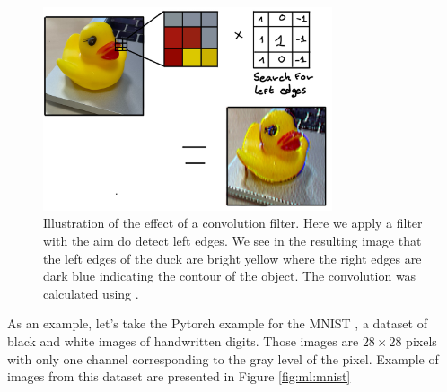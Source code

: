 \documentclass[../main.tex]{subfiles}
\begin{document}
\begin{figure}[ht]
  \centering
  \includegraphics[height=6cm]{images/ml/convolution_exammple.jpg}
  \caption{Illustration of the effect of a convolution filter. Here we apply a filter with the aim do detect left edges. We see in the resulting image that the left edges of the duck are bright yellow where the right edges are dark blue indicating the contour of the object. The convolution was calculated using \cite{allen_generic-github-userimage-convolution-playground_2024}.}
  \label{fig:ml:conv_filter}
\end{figure}

As an example, let's take the Pytorch \cite{ansel_pytorch_2024} example for the MNIST \cite{lecun_gradient-based_1998}, a dataset of black and white images of handwritten digits. Those images are $28 \times 28$ pixels with only one channel corresponding to the gray level of the pixel. Example of images from this dataset are presented in Figure \ref{fig:ml:mnist}
\end{document}
